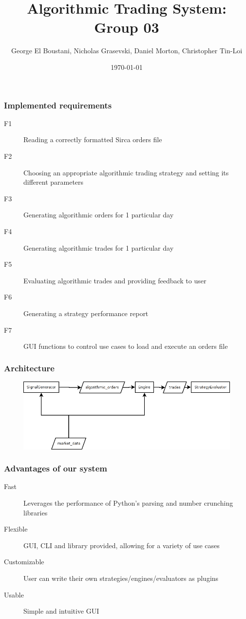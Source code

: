 \documentclass{beamer}
\title{Algorithmic Trading System: Group 03}
\author{George El Boustani, Nicholas Grasevski, Daniel Morton, Christopher Tin-Loi}
\date{\today}
\begin{document}
\begin{frame}
\titlepage
\end{frame}

\begin{frame}
\frametitle{Implemented requirements}
\begin{description}
  \item[F1] Reading a correctly formatted Sirca orders file
  \item[F2] Choosing an appropriate algorithmic trading strategy and setting its different parameters
  \item[F3] Generating algorithmic orders for 1 particular day
  \item[F4] Generating algorithmic trades for 1 particular day
  \item[F5] Evaluating algorithmic trades and providing feedback to user
  \item[F6] Generating a strategy performance report
  \item[F7] GUI functions to control use cases to load and execute an orders file
\end{description}
\end{frame}

\begin{frame}
\frametitle{Architecture}
\begin{figure}
\includegraphics[width=0.8\linewidth]{architecture}
\end{figure}
\end{frame}

\begin{frame}
\frametitle{Advantages of our system}
\begin{description}
  \item[Fast] Leverages the performance of Python's parsing and number crunching libraries
  \item[Flexible] GUI, CLI and library provided, allowing for a variety of use cases
  \item[Customizable] User can write their own strategies/engines/evaluators as plugins
  \item[Usable] Simple and intuitive GUI
\end{description}
\end{frame}
\end{document}
